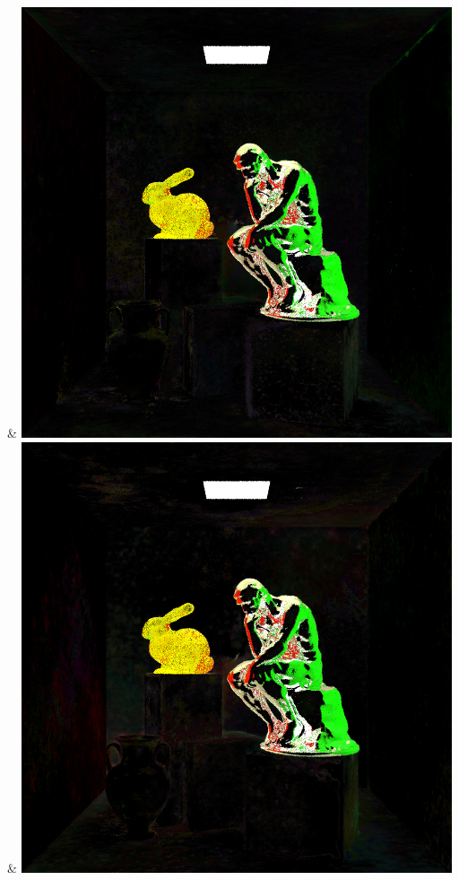 & \includegraphics[width=\linewidth]{figures/py/tests/quality_comparison/nrc+lt+bal_1spp_thinker.png}
& \includegraphics[width=\linewidth]{figures/py/tests/quality_comparison/nrc+lt+balcam_1spp_thinker.png}
